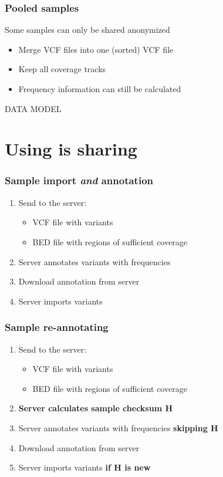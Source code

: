 \documentclass[slidestop]{beamer}
\begin{document}
\begin{frame}
  \frametitle{Pooled samples}
  Some samples can only be shared anonymized
  \begin{itemize}
    \item Merge VCF files into one (sorted) VCF file
    \item Keep all coverage tracks
    \item Frequency information can still be calculated
  \end{itemize}
\end{frame}

\begin{frame}
  DATA MODEL
\end{frame}

\section{Using is sharing}

\begin{frame}
  \frametitle{Sample import {\em and} annotation}
  \begin{enumerate}
    \item Send to the server:
      \begin{itemize}
        \item VCF file with variants
        \item BED file with regions of sufficient coverage
      \end{itemize}
    \item Server annotates variants with frequencies
    \item Download annotation from server
    \item Server imports variants
  \end{enumerate}
\end{frame}

\begin{frame}
  \frametitle{Sample re-annotating}
  \begin{enumerate}
    \item Send to the server:
      \begin{itemize}
        \item VCF file with variants
        \item BED file with regions of sufficient coverage
      \end{itemize}
    \item {\bf Server calculates sample checksum H}
    \item Server annotates variants with frequencies {\bf skipping H}
    \item Download annotation from server
    \item Server imports variants {\bf if H is new}
  \end{enumerate}
\end{frame}
\end{document}
